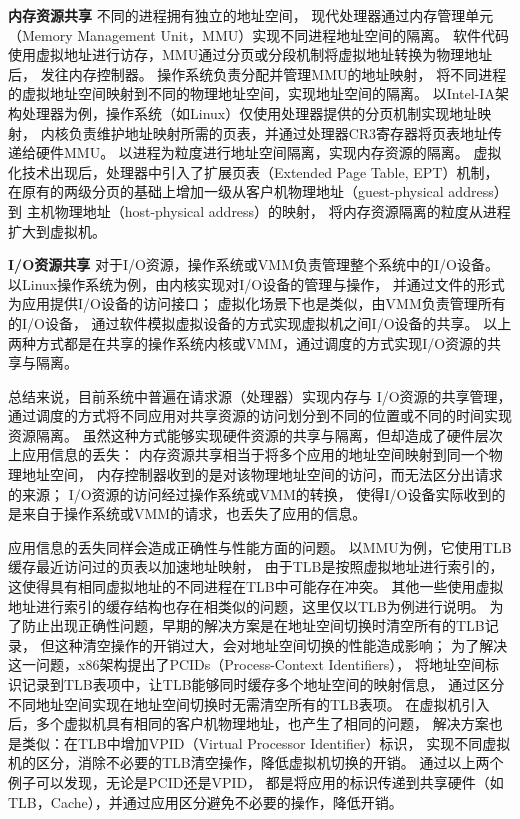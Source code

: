 \textbf{内存资源共享}\quad	%
不同的进程拥有独立的地址空间，
现代处理器通过内存管理单元（Memory Management Unit，MMU）实现不同进程地址空间的隔离。
软件代码使用虚拟地址进行访存，MMU通过分页或分段机制将虚拟地址转换为物理地址后，
发往内存控制器。
操作系统负责分配并管理MMU的地址映射，
将不同进程的虚拟地址空间映射到不同的物理地址空间，实现地址空间的隔离。
以Intel-IA架构处理器为例，操作系统（如Linux）仅使用处理器提供的分页机制实现地址映射，
内核负责维护地址映射所需的页表，并通过处理器CR3寄存器将页表地址传递给硬件MMU。
以进程为粒度进行地址空间隔离，实现内存资源的隔离。
虚拟化技术出现后，处理器中引入了扩展页表（Extended Page Table, EPT）机制，
在原有的两级分页的基础上增加一级从客户机物理地址（guest-physical address）到
主机物理地址（host-physical address）的映射，
将内存资源隔离的粒度从进程扩大到虚拟机。

\textbf{I/O资源共享}\quad	%
对于I/O资源，操作系统或VMM负责管理整个系统中的I/O设备。
以Linux操作系统为例，由内核实现对I/O设备的管理与操作，
并通过文件的形式为应用提供I/O设备的访问接口；
虚拟化场景下也是类似，由VMM负责管理所有的I/O设备，
通过软件模拟虚拟设备的方式实现虚拟机之间I/O设备的共享。
以上两种方式都是在共享的操作系统内核或VMM，通过调度的方式实现I/O资源的共享与隔离。

总结来说，目前系统中普遍在请求源（处理器）实现内存与 I/O资源的共享管理，
通过调度的方式将不同应用对共享资源的访问划分到不同的位置或不同的时间实现资源隔离。
虽然这种方式能够实现硬件资源的共享与隔离，但却造成了硬件层次上应用信息的丢失：
内存资源共享相当于将多个应用的地址空间映射到同一个物理地址空间，
内存控制器收到的是对该物理地址空间的访问，而无法区分出请求的来源；
I/O资源的访问经过操作系统或VMM的转换，
使得I/O设备实际收到的是来自于操作系统或VMM的请求，也丢失了应用的信息。

应用信息的丢失同样会造成正确性与性能方面的问题。
以MMU为例，它使用TLB缓存最近访问过的页表以加速地址映射，
由于TLB是按照虚拟地址进行索引的，这使得具有相同虚拟地址的不同进程在TLB中可能存在冲突。
其他一些使用虚拟地址进行索引的缓存结构也存在相类似的问题，这里仅以TLB为例进行说明。
为了防止出现正确性问题，早期的解决方案是在地址空间切换时清空所有的TLB记录，
但这种清空操作的开销过大，会对地址空间切换的性能造成影响；
为了解决这一问题，x86架构提出了PCIDs（Process-Context Identifiers），
将地址空间标识记录到TLB表项中，让TLB能够同时缓存多个地址空间的映射信息，
通过区分不同地址空间实现在地址空间切换时无需清空所有的TLB表项。
在虚拟机引入后，多个虚拟机具有相同的客户机物理地址，也产生了相同的问题，
解决方案也是类似：在TLB中增加VPID（Virtual Processor Identifier）标识，
实现不同虚拟机的区分，消除不必要的TLB清空操作，降低虚拟机切换的开销。
通过以上两个例子可以发现，无论是PCID还是VPID，
都是将应用的标识传递到共享硬件（如TLB，Cache），并通过应用区分避免不必要的操作，降低开销。

